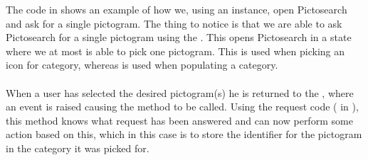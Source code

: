The code in  shows an example of how we, using an  instance, open Pictosearch and ask for a single pictogram. The thing to notice is that we are able to ask Pictosearch for a single pictogram using the . This opens Pictosearch in a state where we at most is able to pick one pictogram. This is used when picking an icon for category, whereas  is used when populating a category. 
\\\\
When a user has selected the desired pictogram(s) he is returned to the \ct, where an event is raised causing the method  to be called. Using the request code ( in ), this method knows what request has been answered and can now perform some action based on this, which in this case is to store the identifier for the pictogram in the category it was picked for.

